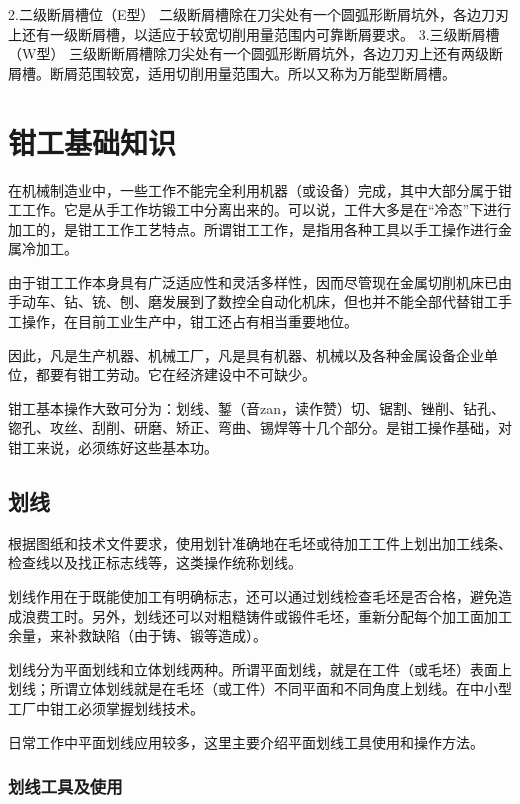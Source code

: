 \documentclass{ctexbook}
\begin{document}
2.二级断屑槽位（E型）
二级断屑槽除在刀尖处有一个圆弧形断屑坑外，各边刀刃上还有一级断屑槽，以适应于较宽切削用量范围内可靠断屑要求。
3.三级断屑槽（W型）
三级断断屑槽除刀尖处有一个圆弧形断屑坑外，各边刀刃上还有两级断屑槽。断屑范围较宽，适用切削用量范围大。所以又称为万能型断屑槽。


                 
                 
                 
                 
                 
                 
                 
                 
                 



\chapter{钳工基础知识}
在机械制造业中，一些工作不能完全利用机器（或设备）完成，其中大部分属于钳工工作。它是从手工作坊锻工中分离出来的。可以说，工件大多是在“冷态”下进行加工的，是钳工工作工艺特点。所谓钳工工作，是指用各种工具以手工操作进行金属冷加工。

由于钳工工作本身具有广泛适应性和灵活多样性，因而尽管现在金属切削机床已由手动车、钻、铳、刨、磨发展到了数控全自动化机床，但也并不能全部代替钳工手工操作，在目前工业生产中，钳工还占有相当重要地位。

因此，凡是生产机器、机械工厂，凡是具有机器、机械以及各种金属设备企业单位，都要有钳工劳动。它在经济建设中不可缺少。

钳工基本操作大致可分为：划线、錾（音zan，读作赞）切、锯割、锉削、钻孔、锪孔、攻丝、刮削、研磨、矫正、弯曲、锡焊等十几个部分。是钳工操作基础，对钳工来说，必须练好这些基本功。
\section{划线}
根据图纸和技术文件要求，使用划针准确地在毛坯或待加工工件上划出加工线条、检查线以及找正标志线等，这类操作统称划线。

划线作用在于既能使加工有明确标志，还可以通过划线检查毛坯是否合格，避免造成浪费工时。另外，划线还可以对粗糙铸件或锻件毛坯，重新分配每个加工面加工余量，来补救缺陷（由于铸、锻等造成）。

划线分为平面划线和立体划线两种。所谓平面划线，就是在工件（或毛坯）表面上划线；所谓立体划线就是在毛坯（或工件）不同平面和不同角度上划线。在中小型工厂中钳工必须掌握划线技术。

日常工作中平面划线应用较多，这里主要介绍平面划线工具使用和操作方法。
\subsection{划线工具及使用}
\end{document}
